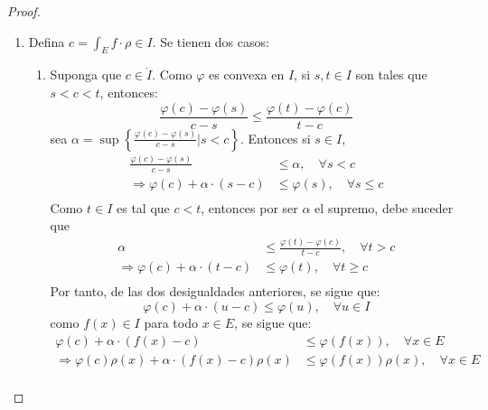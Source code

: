 \documentclass[12pt]{report}
\theoremstyle{largebreak}
\begin{document}
\begin{proof}
\begin{enumerate}
            \item Defina $c=\int_Ef\cdot\rho\in I$. Se tienen dos casos:
            \begin{enumerate}
                \item Suponga que $c\in\mathring{I}$. Como $\varphi$ es convexa en $I$, si $s,t\in I$ son tales que $s<c<t$, entonces:
                \begin{equation*}
                    \frac{\varphi(c)-\varphi(s)}{c-s}\leq\frac{\varphi(t)-\varphi(c)}{t-c}
                \end{equation*}
                sea $\alpha=\sup\left\{\frac{\varphi(c)-\varphi(s)}{c-s}\Big|s<c \right\}$. Entonces si $s\in I$,
                \begin{equation*}
                    \begin{split}
                        \frac{\varphi(c)-\varphi(s)}{c-s}&\leq\alpha,\quad\forall s<c\\
                        \Rightarrow \varphi(c)+\alpha\cdot(s-c)&\leq\varphi(s),\quad\forall s\leq c \\
                    \end{split}
                \end{equation*}
                Como $t\in I$ es tal que $c<t$, entonces por ser $\alpha$ el supremo, debe suceder que
                \begin{equation*}
                    \begin{split}
                        \alpha&\leq\frac{\varphi(t)-\varphi(c)}{t-c},\quad\forall t>c\\
                        \Rightarrow \varphi(c)+\alpha\cdot(t-c)&\leq\varphi(t),\quad\forall t\geq c\\
                    \end{split}
                \end{equation*}
                Por tanto, de las dos desigualdades anteriores, se sigue que:
                \begin{equation*}
                    \varphi(c)+\alpha\cdot(u-c)\leq\varphi(u),\quad\forall u\in I
                \end{equation*}
                como $f(x)\in I$ para todo $x\in E$, se sigue que:
                \begin{equation*}
                    \begin{split}
                        \varphi(c)+\alpha\cdot(f(x)-c)&\leq\varphi(f(x)),\quad\forall x\in E\\
                        \Rightarrow \varphi(c)\rho(x)+\alpha\cdot(f(x)-c)\rho(x)&\leq\varphi(f(x))\rho(x),\quad\forall x\in E\\

\end{split}
\end{equation*}
\end{enumerate}
\end{enumerate}
\end{proof}
\end{document}

